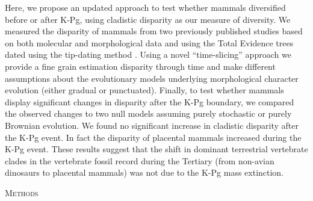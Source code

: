 \documentclass[12pt,letterpaper]{article}
\renewcommand{\section}[1]{%
\bigskip
\begin{center}
\begin{Large}
\normalfont\scshape #1
\medskip
\end{Large}
\end{center}}
\begin{document}
Here, we propose an updated approach to test whether mammals diversified before or after K-Pg, using cladistic disparity as our measure of diversity.
We measured the disparity of mammals from two previously published studies \citep{Slater2012MEE,beckancient2014} based on both molecular and morphological data and using the Total Evidence trees dated using the tip-dating method \citep{ronquista2012,Wood01032013}.
Using a novel ``time-slicing'' approach we provide a fine grain estimation disparity through time and make different assumptions about the evolutionary models underlying morphological character evolution (either gradual or punctuated). 
Finally, to test whether mammals display significant changes in disparity after the K-Pg boundary, we compared the observed changes to two null models assuming purely stochastic or purely Brownian evolution. 
We found no significant increase in cladistic disparity after the K-Pg event. 
In fact the disparity of placental mammals increased during the K-Pg event. 
These results suggest that the shift in dominant terrestrial vertebrate clades in the vertebrate fossil record during the Tertiary (from non-avian dinosaurs to placental mammals) was not due to the K-Pg mass extinction.

%
%

\section{Methods}

\end{document}
